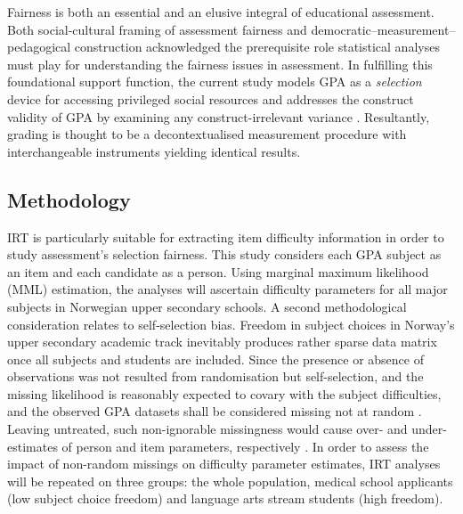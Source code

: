 
Fairness is both an essential and an elusive integral of educational assessment. Both  social-cultural framing of assessment fairness and  democratic--measurement--pedagogical construction acknowledged the prerequisite role statistical analyses must play for understanding the fairness issues in assessment. In fulfilling this foundational support function, the current study models GPA as a \emph{selection} device \parencite[IUA, ][]{kane:2013} for accessing privileged social resources \parencite{bourdieu:1973} and addresses the construct validity of GPA by examining any construct-irrelevant variance \parencite{messick:1989}. Resultantly, grading is thought to be a decontextualised measurement procedure \parencite{kalthoff:2013} with interchangeable instruments yielding identical results.

\subsection{Methodology}

IRT is particularly suitable for extracting item difficulty information in order to study assessment's selection fairness. This study considers each GPA subject as an item and each candidate as a person. Using marginal maximum likelihood (MML) estimation, the analyses will ascertain difficulty parameters for all major subjects in Norwegian upper secondary schools. A second methodological consideration relates to self-selection bias. Freedom in subject choices in Norway's upper secondary academic track inevitably produces rather sparse data matrix once all subjects and students are included. Since the presence or absence of observations was not resulted from randomisation but self-selection, and the missing likelihood is reasonably expected to covary with the subject difficulties, and the observed GPA datasets shall be considered missing not at random \parencite[MNAR,][]{rubin:1976}. Leaving untreated, such non-ignorable missingness would cause over- and under-estimates of person and item parameters, respectively \parencite{rose:2013}. In order to assess the impact of non-random missings on difficulty parameter estimates, IRT analyses will be repeated on three groups: the whole population, medical school applicants (low subject choice freedom) and language arts stream students (high freedom).

